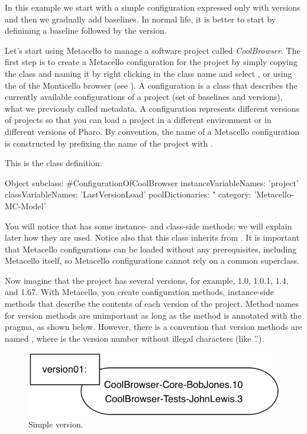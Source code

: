 \documentclass[a4paper,10pt,twoside]{book}
\begin{document}
In this example we start with a simple configuration expressed only with versions and then we gradually add baselines. In normal life, it is better to start by definining a baseline followed by the version.

Let's start using Metacello to manage a software project called \emph{CoolBrowser}. The first step is to create a Metacello configuration for the project by simply copying the class  and naming it  by right clicking in the class name and select , or using the  of the Monticello browser (see ). A configuration is a class that describes the currently available configurations of a project (set of baselines and versions), \ie what we previously called metadata. A configuration represents different versions of projects so that you can load a project in a different environment or in different versions of Pharo. 
By convention, the name of a Metacello configuration is constructed by prefixing the name of the project with .

This is the class definition:
\begin{code}{}
Object subclass: #ConfigurationOfCoolBrowser
       instanceVariableNames: 'project'
       classVariableNames: 'LastVersionLoad'
       poolDictionaries: "
       category: 'Metacello-MC-Model'
\end{code}

You will notice that  has some instance- and class-side methods; we will explain later how they are used. Notice also that this class inherits from .  It is important that Metacello configurations can be loaded without any prerequisites, including Metacello itself, so Metacello configurations cannot rely on a common superclass.

Now imagine that the project  has several versions, for example, 1.0, 1.0.1, 1.4, and 1.67. 
With Metacello, you create configuration methods, instance-side methods that describe the contents of each version of the project. Method names for version methods are unimportant as long as the method is annotated with the  pragma, as shown below.  However, there is a  convention that  version methods are named , where  is the version number without illegal characters (like '.').


\begin{figure}
\begin{center}
\includegraphics[width=0.6\linewidth]{version01}
\caption{Simple version.\label{version01}}
\end{center}
\end{figure}
\end{document}
